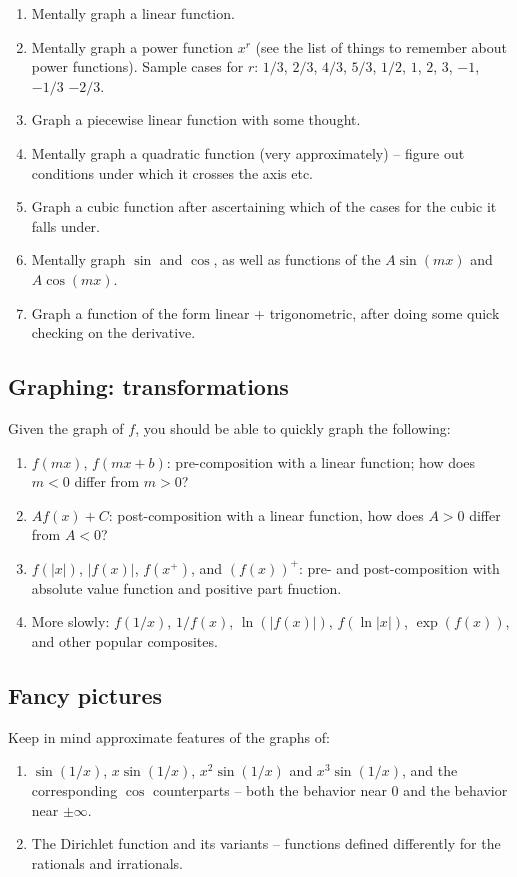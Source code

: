 \documentclass[10pt]{amsart}
\begin{document}
\begin{enumerate}
\item Mentally graph a linear function.
\item Mentally graph a power function $x^r$ (see the list of things to
  remember about power functions). Sample cases for $r$: $1/3$, $2/3$,
  $4/3$, $5/3$, $1/2$, $1$, $2$, $3$, $-1$, $-1/3$ $-2/3$.
\item Graph a piecewise linear function with some thought.
\item Mentally graph a quadratic function (very approximately) --
  figure out conditions under which it crosses the axis etc.
\item Graph a cubic function after ascertaining which of the cases for
  the cubic it falls under.
\item Mentally graph $\sin$ and $\cos$, as well as functions of the $A
  \sin(mx)$ and $A\cos(mx)$.
\item Graph a function of the form linear + trigonometric, after doing
  some quick checking on the derivative.
\end{enumerate}

\subsection{Graphing: transformations}

Given the graph of $f$, you should be able to quickly graph the following:

\begin{enumerate}
\item $f(mx)$, $f(mx + b)$: pre-composition with a linear function;
  how does $m < 0$ differ from $m > 0$?
\item $Af(x) + C$: post-composition with a linear function, how does
  $A > 0$ differ from $A < 0$?
\item $f(|x|)$, $|f(x)|$, $f(x^+)$, and $(f(x))^+$: pre- and
  post-composition with absolute value function and positive part
  fnuction.
\item More slowly: $f(1/x)$, $1/f(x)$, $\ln(|f(x)|)$, $f(\ln|x|)$,
  $\exp(f(x))$, and other popular composites.
\end{enumerate}

\subsection{Fancy pictures}

Keep in mind approximate features of the graphs of:

\begin{enumerate}
\item $\sin(1/x)$, $x\sin(1/x)$, $x^2 \sin(1/x)$ and $x^3\sin(1/x)$,
  and the corresponding $\cos$ counterparts -- both the behavior near
  $0$ and the behavior near $\pm \infty$.
\item The Dirichlet function and its variants -- functions defined
  differently for the rationals and irrationals.
\end{enumerate}
\end{document}
